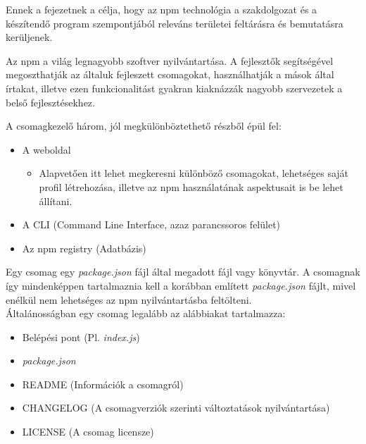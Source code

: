 

Ennek a fejezetnek a célja, hogy az npm technológia a szakdolgozat és a készítendő program szempontjából releváns területei feltárásra és bemutatásra kerüljenek.

Az npm a világ legnagyobb szoftver nyilvántartása. A fejlesztők segítségével megoszthatják az általuk fejleszett csomagokat, használhatják a mások által írtakat, illetve ezen funkcionalitást gyakran kiaknázzák nagyobb szervezetek a belső fejlesztésekhez.

A csomagkezelő három, jól megkülönböztethető részből épül fel:
\begin{itemize}
	\item A weboldal
	\begin{itemize}
		\item Alapvetően itt lehet megkeresni különböző csomagokat, lehetséges saját profil létrehozása, illetve az npm használatának aspektusait is be lehet állítani.
	\end{itemize}
	\item A CLI (Command Line Interface, azaz parancssoros felület)
	\item Az npm registry (Adatbázis)
\end{itemize}

\begin{flushright}
\cite{npm-about}
\end{flushright}


Egy csomag egy \emph{package.json} fájl által megadott fájl vagy könyvtár. A csomagnak így mindenképpen tartalmaznia kell a korábban említett \emph{package.json} fájlt, mivel enélkül nem lehetséges az npm nyilvántartásba feltölteni.\\

Általánosságban egy csomag legalább az alábbiakat tartalmazza: 

\begin{itemize}
	\item Belépési pont (Pl. \emph{index.js})
	\item \emph{package.json}
	\item README (Információk a csomagról)
	\item CHANGELOG (A csomagverziók szerinti változtatások nyilvántartása)
	\item LICENSE (A csomag licensze)
\end{itemize}

